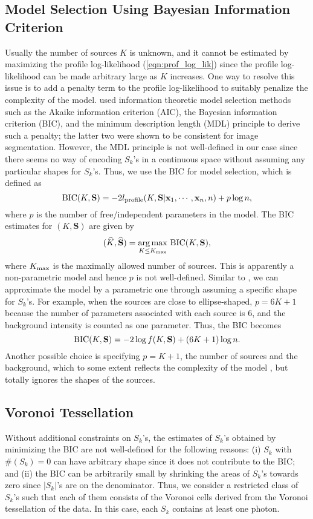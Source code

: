 \documentclass{aastex61}
\begin{document}
\subsection{Model Selection Using Bayesian Information Criterion}
Usually the number of sources $K$ is unknown, and it cannot be estimated by maximizing the profile log-likelihood (\ref{eqn:prof_log_lik}) since the profile log-likelihood can be made arbitrary large as $K$ increases.
One way to resolve this issue is to add a penalty term to the profile log-likelihood to suitably penalize the complexity of the model. \citet{Aue-11} used information theoretic model selection methods such as the Akaike information criterion (AIC), the Bayesian information criterion (BIC), and the minimum description length (MDL) principle to derive such a penalty; the latter two were shown to be consistent for image segmentation.
However, the MDL principle is not well-defined in our case since there seems no way of encoding $S_k$'s in a continuous space without assuming any particular shapes for $S_k$'s. Thus, we use the BIC for model selection, which is defined as
$${\rm BIC}(K, \mathbf{S})=-2l_{\rm profile}(K, \mathbf{S}|\mathbf{x}_1, \cdots, \mathbf{x}_n, n)+p\log n,$$
where $p$ is the number of free/independent parameters in the model. The BIC estimates for $(K, \mathbf{S})$ are given by
$$(\widehat{K}, \widehat{\mathbf{S}})=\underset{K\leq K_{\rm max}}{\operatorname{arg\, max}}~{\rm BIC}(K, \mathbf{S}),$$
where $K_{\rm max}$ is the maximally allowed number of sources.
This is apparently a non-parametric model and hence $p$ is not well-defined. Similar to \citet{Aue-11}, we can approximate the model by a parametric one through assuming a specific shape for $S_k$'s.
For example, when the sources are close to ellipse-shaped, $p=6K+1$ because 
the number of parameters associated with each source is $6$, and the background intensity is counted as one parameter. Thus, the BIC becomes
$${\rm BIC}(K, \mathbf{S})=-2\log f(K, \mathbf{S})+(6K+1)\log n.$$
 Another possible choice is specifying $p=K+1$, the number of sources and the background, which to some extent reflects the complexity
of the model \citep{Magnussen-06}, but totally ignores the shapes of the sources.

\subsection{Voronoi Tessellation}
Without additional constraints on $S_k$'s, the estimates of $S_k$'s obtained by minimizing the BIC are not well-defined for the following reasons: (i) $S_k$ with $\#(S_k)=0$ can have arbitrary shape 
since it does not contribute to the BIC; and (ii) the BIC can be arbitrarily small by shrinking the areas of $S_k$'s towards zero since $|S_k|$'s are on the denominator. Thus, we consider a restricted class of $S_k$'s such that each of them consists of the Voronoi cells derived from the Voronoi tessellation of the data. In this case, each $S_k$ contains at least one photon.
\end{document}
